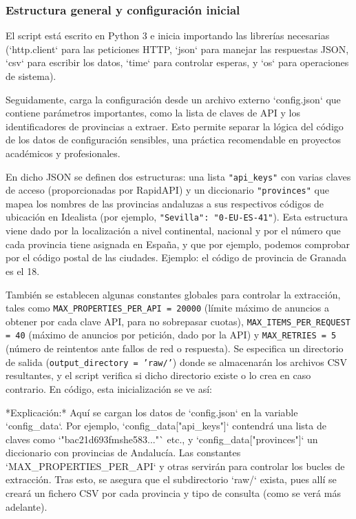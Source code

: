 \documentclass[a4paper,11pt]{book}
\begin{document}
\subsubsection{Estructura general y configuración inicial}

El script está escrito en Python 3 e inicia importando las librerías necesarias (`http.client` para las peticiones HTTP, `json` para manejar las respuestas JSON, `csv` para escribir los datos, `time` para controlar esperas, y `os` para operaciones de sistema). 

Seguidamente, carga la configuración desde un archivo externo `config.json` que contiene parámetros importantes, como la lista de claves de API y los identificadores de provincias a extraer. Esto permite separar la lógica del código de los datos de configuración sensibles, una práctica recomendable en proyectos académicos y profesionales. 


En dicho JSON se definen dos estructuras: una lista \texttt{"api\_keys"} con varias claves de acceso (proporcionadas por RapidAPI) y un diccionario \texttt{"provinces"} que mapea los nombres de las provincias andaluzas a sus respectivos códigos de ubicación en Idealista (por ejemplo, \texttt{"Sevilla": "0-EU-ES-41"}). Esta estructura viene dado por la localización a nivel continental, nacional y por el número que cada provincia tiene asignada en España, y que por ejemplo, podemos comprobar por el código postal de las ciudades. Ejemplo: el código de provincia de Granada es el 18.

También se establecen algunas constantes globales para controlar la extracción, tales como \texttt{MAX\_PROPERTIES\_PER\_API = 20000} (límite máximo de anuncios a obtener por cada clave API, para no sobrepasar cuotas), \texttt{MAX\_ITEMS\_PER\_REQUEST = 40} (máximo de anuncios por petición, dado por la API) y \texttt{MAX\_RETRIES = 5} (número de reintentos ante fallos de red o respuesta). Se especifica un directorio de salida (\texttt{output\_directory = 'raw/'}) donde se almacenarán los archivos CSV resultantes, y el script verifica si dicho directorio existe o lo crea en caso contrario. En código, esta inicialización se ve así:





*Explicación:* Aquí se cargan los datos de `config.json` en la variable `config_data`. Por ejemplo, `config_data["api_keys"]` contendrá una lista de claves como `"bac21d693fmshe583..."` etc., y `config_data["provinces"]` un diccionario con provincias de Andalucía. Las constantes `MAX_PROPERTIES_PER_API` y otras servirán para controlar los bucles de extracción. Tras esto, se asegura que el subdirectorio `raw/` exista, pues allí se creará un fichero CSV por cada provincia y tipo de consulta (como se verá más adelante).
\end{document}

